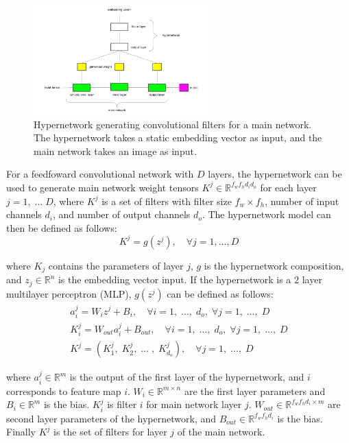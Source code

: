 \begin{figure} [H]
   	\centering
    	\includegraphics[width=0.6\textwidth, height=0.4\textwidth]{hypernetwork.png}
	\captionsetup{justification=centering}
	\caption{Hypernetwork generating convolutional filters for a main network. The hypernetwork takes a static embedding vector as input, and the main network takes an image as input.}
\end{figure}

\noindent For a feedfoward convolutional network with $ D $ layers, the hypernetwork can be used to generate main network weight tensors $ K^j \in \mathbb{R}^{f_wf_hd_id_o} $ for each layer $ j = 1, \; \dots \; D $, where $ K^j $ is a set of filters with filter size $ f_w \times f_h $, number of input channels $ d_i $, and number of output channels $ d_o $. The hypernetwork model can then be defined as follows: 
\begin{equation}
	K^j = g(z^j), \quad \forall j = 1, \dots, D
\end{equation}

\noindent where $ K_j $ contains the parameters of layer $ j $, $ g $ is the hypernetwork composition, and $ z_j \in \mathbb{R}^n $ is the embedding vector input. If the hypernetwork is a $ 2 $ layer multilayer perceptron (MLP), $ g(z^j) $ can be defined as follows:  
\begin{subequations}
	\begin{gather}
		a_i^j = W_iz^j + B_i, \quad \forall i = 1, \; \dots, \; d_o, \; \forall j = 1, \; \dots, \; D \\
		K_i^j = W_{out}a_i^j + B_{out}, \quad \forall i = 1, \; \dots, \; d_o, \; \forall j = 1, \; \dots, \; D \\
		K^j = (K_1^j, \; K_2^j, \; \dots \;, \; K_{d_o}^j), \quad \forall j = 1, \; \dots, \; D
	\end{gather}
\end{subequations}

\noindent where $ a_i^j \in \mathbb{R}^{m} $ is the output of the first layer of the hypernetwork, and $ i $ corresponds to feature map $ i $. $ W_i \in \mathbb{R}^{m \times n} $ are the first layer parameters and $ B_i \in \mathbb{R}^m $ is the bias. $ K_i^j $ is filter $ i $ for main network layer $ j $. $ W_{out} \in \mathbb{R}^{f_w f_hd_i \times m} $ are second layer parameters of the hypernetwork, and $ B_{out} \in \mathbb{R}^{f_wf_hd_i} $ is the bias. Finally $ K^j $ is the set of filters for layer $ j $ of the main network. \par

